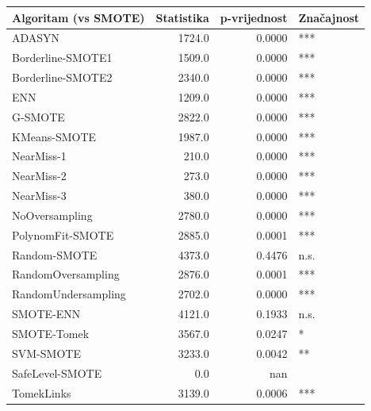 \begin{tabular}{lrrl}
\toprule
Algoritam (vs SMOTE) & Statistika & p-vrijednost & Značajnost \\
\midrule
ADASYN & 1724.0 & 0.0000 & *** \\
Borderline-SMOTE1 & 1509.0 & 0.0000 & *** \\
Borderline-SMOTE2 & 2340.0 & 0.0000 & *** \\
ENN & 1209.0 & 0.0000 & *** \\
G-SMOTE & 2822.0 & 0.0000 & *** \\
KMeans-SMOTE & 1987.0 & 0.0000 & *** \\
NearMiss-1 & 210.0 & 0.0000 & *** \\
NearMiss-2 & 273.0 & 0.0000 & *** \\
NearMiss-3 & 380.0 & 0.0000 & *** \\
NoOversampling & 2780.0 & 0.0000 & *** \\
PolynomFit-SMOTE & 2885.0 & 0.0001 & *** \\
Random-SMOTE & 4373.0 & 0.4476 & n.s. \\
RandomOversampling & 2876.0 & 0.0001 & *** \\
RandomUndersampling & 2702.0 & 0.0000 & *** \\
SMOTE-ENN & 4121.0 & 0.1933 & n.s. \\
SMOTE-Tomek & 3567.0 & 0.0247 & * \\
SVM-SMOTE & 3233.0 & 0.0042 & ** \\
SafeLevel-SMOTE & 0.0 & nan &  \\
TomekLinks & 3139.0 & 0.0006 & *** \\
\bottomrule
\end{tabular}
